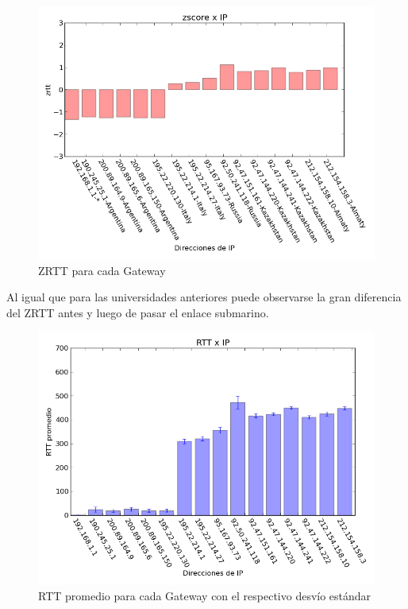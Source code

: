 \begin{figure}[H]
	\begin{center}
		  \includegraphics[scale=0.5]{../graficos_informe/aipet_zscore.png}
		  \caption{ZRTT para cada Gateway}
		  \label{fig:contra1}
	\end{center}
\end{figure}

Al igual que para las universidades anteriores puede observarse la gran diferencia del ZRTT antes y luego de pasar el enlace submarino.

\begin{figure}[H]
	\begin{center}
		  \includegraphics[scale=0.5]{../graficos_informe/aipet_rtt.png}
		  \caption{RTT promedio para cada Gateway con el respectivo desvío estándar}
		  \label{fig:contra1}
	\end{center}
\end{figure}


